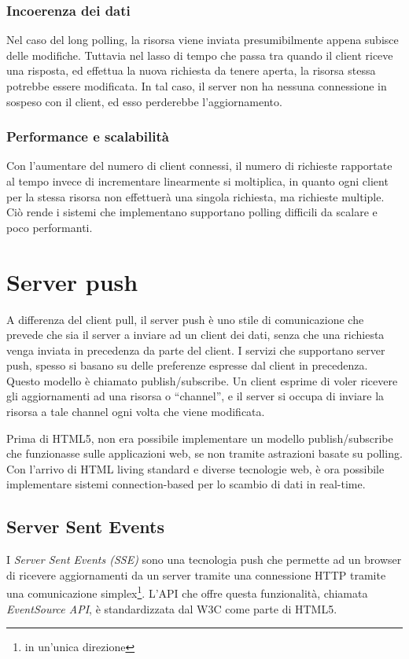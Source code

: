 \documentclass[12pt,a4paper,openright,twoside]{report}
\begin{document}
\subsubsection{Incoerenza dei dati}
Nel caso del long polling, la risorsa viene inviata presumibilmente appena subisce delle modifiche. Tuttavia nel lasso di tempo che passa tra quando il client riceve una risposta, ed effettua la nuova richiesta da tenere aperta, la risorsa stessa potrebbe essere modificata. In tal caso, il server non ha nessuna connessione in sospeso con il client, ed esso perderebbe l’aggiornamento. 

\subsubsection{Performance e scalabilità}
Con l’aumentare del numero di client connessi, il numero di richieste rapportate al tempo invece di incrementare linearmente si moltiplica, in quanto ogni client per la stessa risorsa non effettuerà una singola richiesta, ma richieste multiple. Ciò rende i sistemi che implementano supportano polling difficili da scalare e poco performanti.

\section{Server push}\label{sec_serverpush}
A differenza del client pull, il server push è uno stile di comunicazione che prevede che sia il server a inviare ad un client dei dati, senza che una richiesta venga inviata in precedenza da parte del client. I servizi che supportano server push, spesso si basano su delle preferenze espresse dal client in precedenza. Questo modello è chiamato publish/subscribe. Un client esprime di voler ricevere gli aggiornamenti ad una risorsa o “channel”, e il server si occupa di inviare la risorsa a tale channel ogni volta che viene modificata.

\bigskip

Prima di HTML5, non era possibile implementare un modello publish/subscribe che funzionasse sulle applicazioni web, se non tramite astrazioni basate su polling. Con l’arrivo di HTML living standard e diverse tecnologie web, è ora possibile implementare sistemi connection-based per lo scambio di dati in real-time.

\subsection{Server Sent Events}
I \textit{Server Sent Events (SSE)} sono una tecnologia push che permette ad un browser di ricevere aggiornamenti da un server tramite una connessione HTTP tramite una comunicazione simplex\footnote{in un'unica direzione}. L'API che offre questa funzionalità, chiamata \textit{EventSource API}, è standardizzata dal W3C come parte di HTML5.
\end{document}
